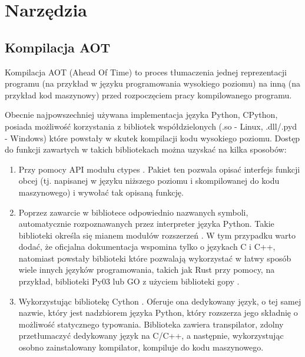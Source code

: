 \documentclass[11pt, a4paper]{article}
\begin{document}
\begin{sloppypar}
    \section{Narzędzia}
    \subsection{Kompilacja AOT}
    Kompilacja AOT (Ahead Of Time) to proces tłumaczenia jednej reprezentacji programu (na
    przykład w języku programowania wysokiego poziomu) na inną (na przykład kod
    maszynowy) przed rozpoczęciem pracy kompilowanego programu.

    Obecnie najpowszechniej używana implementacja języka Python, CPython, posiada możliwość
    korzystania z bibliotek współdzielonych (.so - Linux, .dll/.pyd - Windows) które powstały
    w skutek kompilacji kodu wysokiego poziomu. Dostęp do funkcji zawartych w takich
    bibliotekach można uzyskać na kilka sposobów:

    \begin{enumerate}
      \item Przy pomocy API modułu ctypes \cite{Python_ctypes}. Pakiet ten pozwala
        opisać interfejs funkcji obcej (tj. napisanej w języku niższego poziomu i
        skompilowanej do kodu maszynowego) i wywołać tak opisaną funkcję.

      \item Poprzez zawarcie w bibliotece odpowiednio nazwanych symboli, automatycznie
        rozpoznawanych przez interpreter języka Python. Takie biblioteki określa się mianem
        modułów rozszerzeń \cite{Extending_Python_With_C_Cpp}. W tym przypadku warto
        dodać, że oficjalna dokumentacja \cite{Python_extension} wspomina tylko o językach
        C i C++, natomiast powstały biblioteki które pozwalają wykorzystać w łatwy
        sposób wiele innych języków programowania, takich jak Rust \cite{Rust_Programming_Language}
        przy pomocy, na przykład, biblioteki Py03 \cite{PyO3} lub GO z użyciem biblioteki
        gopy \cite{gopy}.

      \item Wykorzystując bibliotekę Cython \cite{Cython_Org} \cite{Cython_The_Best_Of_Both}.
        Oferuje ona dedykowany język, o tej samej nazwie, który jest nadzbiorem języka
        Python, który rozszerza jego składnię o możliwość statycznego typowania.
        Biblioteka zawiera transpilator, zdolny przetłumaczyć dedykowany język na C/C++,
        a następnie, wykorzystując osobno zainstalowany kompilator, kompiluje do kodu
        maszynowego.


\end{enumerate}
\end{sloppypar}
\end{document}
